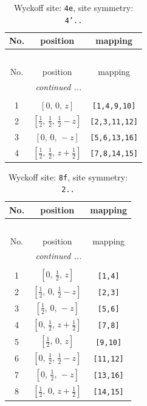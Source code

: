 \documentclass[fleqn,8pt]{jsarticle}
\begin{document}
\renewcommand{\arraystretch}{1.2}
\begin{longtable}{ccc}
\caption{Wyckoff site: {\tt 4e}, site symmetry: {\tt 4'..}}
 \\
 \hline \hline
No. & position & mapping \\ \hline \endfirsthead

\multicolumn{2}{l}{\tablename\ \thetable{}} \\
 \hline \hline
No. & position & mapping \\ \hline \endhead

 \hline \hline
\multicolumn{2}{r}{\footnotesize\it continued ...} \\ \endfoot

 \hline \hline
\multicolumn{2}{r}{} \\ \endlastfoot

1 & $\left[ 0,\, 0,\, z \right]$ & {\tt [1,4,9,10]} \\ \hline
2 & $\left[ \frac{1}{2},\, \frac{1}{2},\, \frac{1}{2} - z \right]$ & {\tt [2,3,11,12]} \\ \hline
3 & $\left[ 0,\, 0,\, - z \right]$ & {\tt [5,6,13,16]} \\ \hline
4 & $\left[ \frac{1}{2},\, \frac{1}{2},\, z + \frac{1}{2} \right]$ & {\tt [7,8,14,15]} \\
\end{longtable}
\renewcommand{\arraystretch}{1.2}
\begin{longtable}{ccc}
\caption{Wyckoff site: {\tt 8f}, site symmetry: {\tt 2..}}
 \\
 \hline \hline
No. & position & mapping \\ \hline \endfirsthead

\multicolumn{2}{l}{\tablename\ \thetable{}} \\
 \hline \hline
No. & position & mapping \\ \hline \endhead

 \hline \hline
\multicolumn{2}{r}{\footnotesize\it continued ...} \\ \endfoot

 \hline \hline
\multicolumn{2}{r}{} \\ \endlastfoot

1 & $\left[ 0,\, \frac{1}{2},\, z \right]$ & {\tt [1,4]} \\ \hline
2 & $\left[ \frac{1}{2},\, 0,\, \frac{1}{2} - z \right]$ & {\tt [2,3]} \\ \hline
3 & $\left[ \frac{1}{2},\, 0,\, - z \right]$ & {\tt [5,6]} \\ \hline
4 & $\left[ 0,\, \frac{1}{2},\, z + \frac{1}{2} \right]$ & {\tt [7,8]} \\ \hline
5 & $\left[ \frac{1}{2},\, 0,\, z \right]$ & {\tt [9,10]} \\ \hline
6 & $\left[ 0,\, \frac{1}{2},\, \frac{1}{2} - z \right]$ & {\tt [11,12]} \\ \hline
7 & $\left[ 0,\, \frac{1}{2},\, - z \right]$ & {\tt [13,16]} \\ \hline
8 & $\left[ \frac{1}{2},\, 0,\, z + \frac{1}{2} \right]$ & {\tt [14,15]} \\
\end{longtable}
\end{document}
